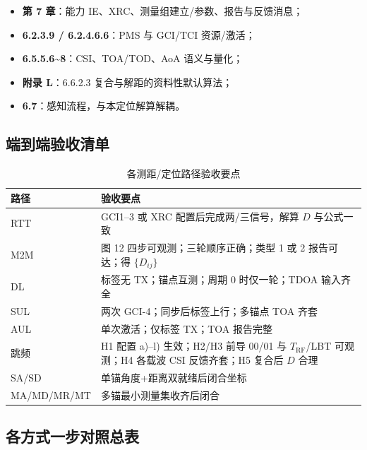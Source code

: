 \documentclass[11pt,a4paper]{ctexart}
\begin{document}
\begin{itemize}[nosep]
  \item \textbf{第 7 章}：能力 IE、XRC、测量组建立/参数、报告与反馈消息；
  \item \textbf{6.2.3.9 / 6.2.4.6.6}：PMS 与 GCI/TCI 资源/激活；
  \item \textbf{6.5.5.6\textasciitilde 8}：CSI、TOA/TOD、AoA 语义与量化；
  \item \textbf{附录 L}：6.6.2.3 复合与解距的资料性默认算法；
  \item \textbf{6.7}：感知流程，与本定位解算解耦。
\end{itemize}

\subsection{端到端验收清单}

\begin{longtable}{L{2.2cm}L{10.5cm}}
\caption{各测距/定位路径验收要点\label{tab:66-accept}} \\
\toprule
\textbf{路径} & \textbf{验收要点} \\
\midrule
RTT & GCI1--3 或 XRC 配置后完成两/三信号，解算 $D$ 与公式一致 \\
M2M & 图 12 四步可观测；三轮顺序正确；类型 1 或 2 报告可达；得 $\{D_{ij}\}$ \\
DL & 标签无 TX；锚点互测；周期 0 时仅一轮；TDOA 输入齐全 \\
SUL & 两次 GCI-4；同步后标签上行；多锚点 TOA 齐套 \\
AUL & 单次激活；仅标签 TX；TOA 报告完整 \\
跳频 & H1 配置 a)--l) 生效；H2/H3 前导 00/01 与 $T_{\mathrm{RF}}$/LBT 可观测；H4 各载波 CSI 反馈齐套；H5 复合后 $D$ 合理 \\
SA/SD & 单锚角度+距离双就绪后闭合坐标 \\
MA/MD/MR/MT & 多锚最小测量集收齐后闭合 \\
\bottomrule
\end{longtable}

\subsection{各方式一步对照总表}
\end{document}
